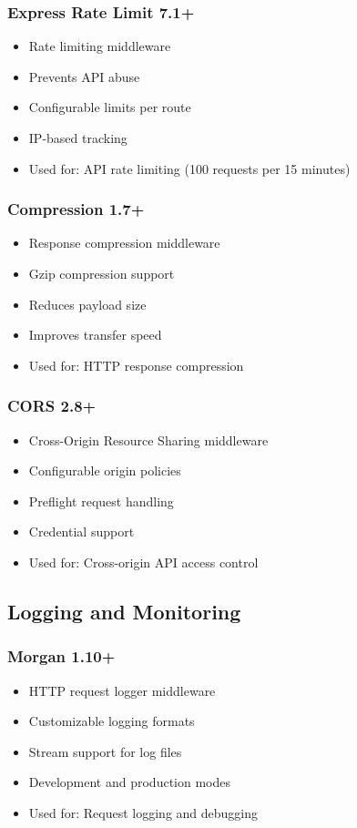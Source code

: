 \documentclass[12pt,a4paper]{report}
\begin{document}
\subsubsection{Express Rate Limit 7.1+}
\begin{itemize}[leftmargin=*]
    \item Rate limiting middleware
    \item Prevents API abuse
    \item Configurable limits per route
    \item IP-based tracking
    \item Used for: API rate limiting (100 requests per 15 minutes)
\end{itemize}

\subsubsection{Compression 1.7+}
\begin{itemize}[leftmargin=*]
    \item Response compression middleware
    \item Gzip compression support
    \item Reduces payload size
    \item Improves transfer speed
    \item Used for: HTTP response compression
\end{itemize}

\subsubsection{CORS 2.8+}
\begin{itemize}[leftmargin=*]
    \item Cross-Origin Resource Sharing middleware
    \item Configurable origin policies
    \item Preflight request handling
    \item Credential support
    \item Used for: Cross-origin API access control
\end{itemize}

\subsection{Logging and Monitoring}

\subsubsection{Morgan 1.10+}
\begin{itemize}[leftmargin=*]
    \item HTTP request logger middleware
    \item Customizable logging formats
    \item Stream support for log files
    \item Development and production modes
    \item Used for: Request logging and debugging
\end{itemize}
\end{document}

